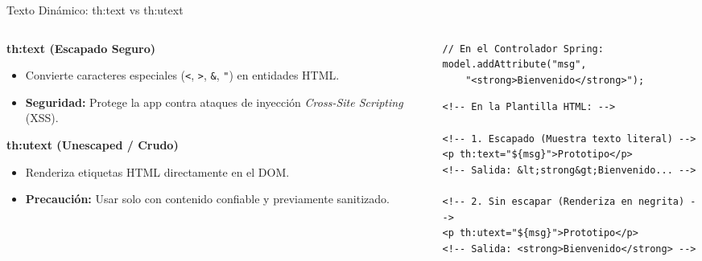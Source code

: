 \documentclass[aspectratio=169]{beamer}
\begin{document}
\begin{frame}[fragile]{Texto Din\'amico: th:text vs th:utext}
\begin{columns}[T]
\begin{column}{0.48\textwidth}
  \textbf{th:text (Escapado Seguro)}
  \begin{itemize}
    \item Convierte caracteres especiales (\texttt{<}, \texttt{>}, \texttt{\&}, \texttt{"}) en entidades HTML.
    \item \textbf{Seguridad:} Protege la app contra ataques de inyecci\'on \textit{Cross-Site Scripting} (XSS).
  \end{itemize}
  \vspace{4pt}
  \textbf{th:utext (Unescaped / Crudo)}
  \begin{itemize}
    \item Renderiza etiquetas HTML directamente en el DOM.
    \item \textbf{Precauci\'on:} Usar solo con contenido confiable y previamente sanitizado.
  \end{itemize}
\end{column}
\begin{column}{0.50\textwidth}
\begin{lstlisting}[style=SpringCodeStyle]
// En el Controlador Spring:
model.addAttribute("msg", 
    "<strong>Bienvenido</strong>");
\end{lstlisting}
\begin{lstlisting}[style=ThymeleafStyle]
<!-- En la Plantilla HTML: -->

<!-- 1. Escapado (Muestra texto literal) -->
<p th:text="${msg}">Prototipo</p>
<!-- Salida: &lt;strong&gt;Bienvenido... -->

<!-- 2. Sin escapar (Renderiza en negrita) -->
<p th:utext="${msg}">Prototipo</p>
<!-- Salida: <strong>Bienvenido</strong> -->
\end{lstlisting}
\end{column}
\end{columns}
\end{frame}
\end{document}

